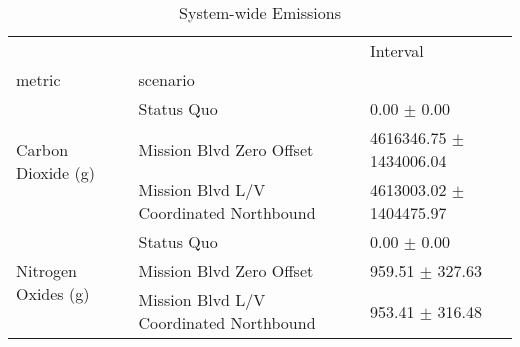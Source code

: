 \begin{table}
\caption{System-wide Emissions}
\begin{tabular}{lll}
\toprule
 &  & Interval \\
metric & scenario &  \\
\midrule
\multirow[t]{3}{*}{Carbon Dioxide (g)} & Status Quo & 0.00 $\pm$ 0.00 \\
 & Mission Blvd Zero Offset & 4616346.75 $\pm$ 1434006.04 \\
 & Mission Blvd L/V Coordinated Northbound & 4613003.02 $\pm$ 1404475.97 \\
\multirow[t]{3}{*}{Nitrogen Oxides (g)} & Status Quo & 0.00 $\pm$ 0.00 \\
 & Mission Blvd Zero Offset & 959.51 $\pm$ 327.63 \\
 & Mission Blvd L/V Coordinated Northbound & 953.41 $\pm$ 316.48 \\
\bottomrule
\end{tabular}
\end{table}

